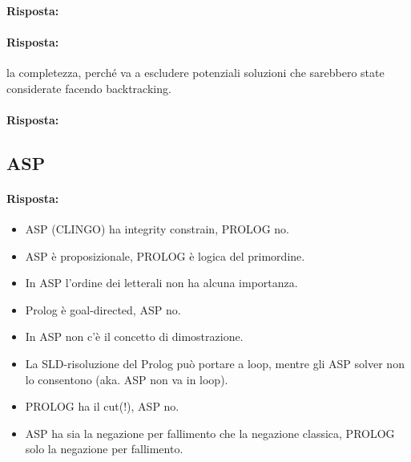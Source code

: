 \paragraph{Risposta:}


\paragraph{Risposta:} la completezza, perché va a escludere potenziali soluzioni che sarebbero state considerate facendo backtracking.


\paragraph{Risposta:}

\subsection{ASP}




\paragraph{Risposta:}

\begin{itemize}
  \item ASP (CLINGO) ha integrity constrain, PROLOG no.
  \item ASP è proposizionale, PROLOG è logica del primordine. 
\item In ASP l’ordine dei letterali non ha alcuna importanza. 
  \item Prolog è goal-directed, ASP no.
  \item In ASP non c'è il concetto di dimostrazione.
  \item La SLD-risoluzione del Prolog può portare a loop,
mentre gli ASP solver non lo consentono (aka. ASP non va in loop). 
\item PROLOG ha il cut(!), ASP no.
\item ASP ha sia la negazione per fallimento che la negazione classica, PROLOG solo la negazione per fallimento.
\end{itemize}

